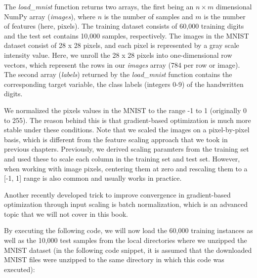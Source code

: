 \documentclass[11pt]{article}
\begin{document}
    The \emph{load\_mnist} function returns two arrays, the first being an
\(n \times m\) dimensional NumPy array (\emph{images}), where \(n\) is
the number of samples and \(m\) is the number of features (here,
pixels). The training dataset consists of 60,000 training digits and the
test set contains 10,000 samples, respectively. The images in the MNIST
dataset consist of 28 x 28 pixels, and each pixel is represented by a
gray scale intensity value. Here, we unroll the 28 x 28 pixels into
one-dimensional row vectors, which represent the rows in our
\emph{images} array (784 per row or image). The second array
(\emph{labels}) returned by the \emph{load\_mnist} function contains the
corresponding target variable, the class labels (integers 0-9) of the
handwritten digits.

We normalized the pixels values in the MNIST to the range -1 to 1
(originally 0 to 255). The reason behind this is that gradient-based
optimization is much more stable under these conditions. Note that we
scaled the images on a pixel-by-pixel basis, which is different from the
feature scaling approach that we took in previous chapters. Previously,
we derived scaling paramters from the training set and used these to
scale each column in the training set and test set. However, when
working with image pixels, centering them at zero and rescaling them to
a {[}-1, 1{]} range is also common and usually works in practice.

Another recently developed trick to improve convergence in
gradient-based optimization through input scaling is batch
normalization, which is an advanced topic that we will not cover in this
book.

By executing the following code, we will now load the 60,000 training
instances as well as the 10,000 test samples from the local directories
where we unzipped the MNIST dataset (in the following code snippet, it
is assumed that the downloaded MNIST files were unzipped to the same
directory in which this code was executed):
\end{document}
